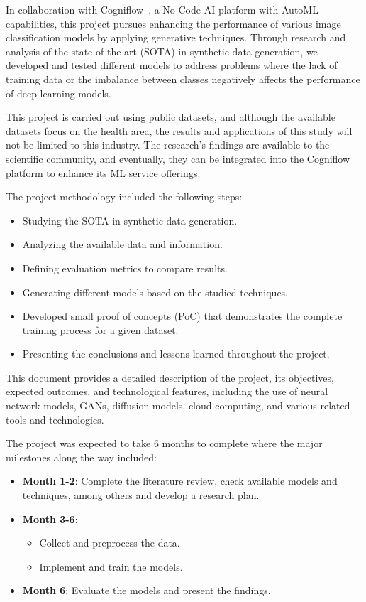 In collaboration with Cogniflow~\cite{cogniflow}, a No-Code AI platform with AutoML capabilities, this project pursues enhancing the performance of various image classification models by applying generative techniques. Through research and analysis of the state of the art (SOTA) in synthetic data generation, we developed and tested different models to address problems where the lack of training data or the imbalance between classes negatively affects the performance of deep learning models.
    
This project is carried out using public datasets, and although the available datasets focus on the health area, the results and applications of this study will not be limited to this industry. The research's findings are available to the scientific community, and eventually, they can be integrated into the Cogniflow platform to enhance its ML service offerings.

The project methodology included the following steps:
    
\begin{itemize}
    \item Studying the SOTA in synthetic data generation.
    \item Analyzing the available data and information.
    \item Defining evaluation metrics to compare results.
    \item Generating different models based on the studied techniques.
    \item Developed small proof of concepts (PoC) that demonstrates the complete training process for a given dataset.
    \item Presenting the conclusions and lessons learned throughout the project.
\end{itemize}

This document provides a detailed description of the project, its objectives, expected outcomes, and technological features, including the use of neural network models, GANs, diffusion models, cloud computing, and various related tools and technologies.

The project was expected to take 6 months to complete where the major milestones along the way included:

\begin{itemize}
    \item \textbf{Month 1-2}: Complete the literature review, check available models and techniques, among others and develop a research plan.
    \item \textbf{Month 3-6}:
    \begin{itemize}
    \item Collect and preprocess the data.
    \item Implement and train the models.
        \end{itemize}
    \item \textbf{Month 6}: Evaluate the models and present the findings.
\end{itemize}

